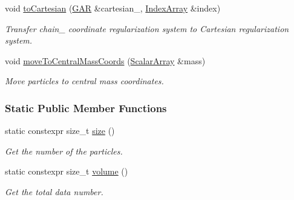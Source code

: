\begin{DoxyCompactItemize}
void \mbox{\hyperlink{class_g_a_r_a2a282218e90ffb1a367da364b70e54a3}{to\+Cartesian}} (\mbox{\hyperlink{class_g_a_r}{G\+AR}} \&cartesian_, \mbox{\hyperlink{class_g_a_r_aaf033049c0cd8f0f86a82b9595086fa5}{Index\+Array}} \&index)
\begin{DoxyCompactList}\small\item\em Transfer chain_ coordinate regularization system to Cartesian regularization system. \end{DoxyCompactList}\item
void \mbox{\hyperlink{class_g_a_r_a373d938047a04b051683ee93198b1832}{move\+To\+Central\+Mass\+Coords}} (\mbox{\hyperlink{class_g_a_r_a0b446684ae922457a3bf86c904085d8a}{Scalar\+Array}} \&mass)
\begin{DoxyCompactList}\small\item\em Move particles to central mass coordinates. \end{DoxyCompactList}\end{DoxyCompactItemize}
\subsubsection*{Static Public Member Functions}
\begin{DoxyCompactItemize}
\item 
static constexpr size\+\_\+t \mbox{\hyperlink{class_g_a_r_a850c24cdfd1656389e3e42f575035edb}{size}} ()
\begin{DoxyCompactList}\small\item\em Get the number of the particles. \end{DoxyCompactList}\item 
static constexpr size\+\_\+t \mbox{\hyperlink{class_g_a_r_abdbcc31db058125bd2ee207e7648b20b}{volume}} ()
\begin{DoxyCompactList}\small\item\em Get the total data number. \end{DoxyCompactList}\end{DoxyCompactItemize}
